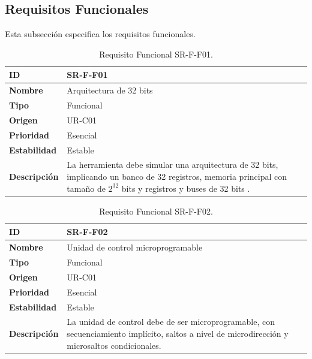 \clearpage
\subsection{Requisitos Funcionales}

Esta subsección especifica los requisitos funcionales.

\begin{center}
\begin{table}[htbp]
\centering
\begin{tabular}{@{}p{2.5cm} p{9cm}@{}} 
\toprule
\textbf{ID} 				& SR-F-F01 \\
\midrule
\textbf{Nombre} 			& Arquitectura de 32 bits \\
\midrule
\textbf{Tipo} 			& Funcional \\
\midrule
\textbf{Origen} 			& UR-C01 \\
\midrule
\textbf{Prioridad}		& Esencial \\
\midrule
\textbf{Estabilidad} 		& Estable \\
\midrule
\textbf{Descripción} 	& La herramienta debe simular una arquitectura de 32 bits, implicando un banco de 32 registros, memoria principal con tamaño de  $2^{32}$ bits y registros y buses de 32 bits . \\
\bottomrule
\end{tabular}
\caption{Requisito Funcional SR-F-F01.}
\label{tab:srff01}
\end{table}
\end{center}

\begin{center}
\begin{table}[htbp]
\centering
\begin{tabular}{@{}p{2.5cm} p{9cm}@{}} 
\toprule
\textbf{ID} 				& SR-F-F02 \\
\midrule
\textbf{Nombre} 			& Unidad de control microprogramable \\
\midrule
\textbf{Tipo} 			& Funcional \\
\midrule
\textbf{Origen} 			& UR-C01 \\
\midrule
\textbf{Prioridad}		& Esencial \\
\midrule
\textbf{Estabilidad} 		& Estable \\
\midrule
\textbf{Descripción} 	& La unidad de control debe de ser microprogramable, con secuenciamiento implícito, saltos a nivel de microdirección y microsaltos condicionales. \\
\bottomrule
\end{tabular}
\caption{Requisito Funcional SR-F-F02.}
\label{tab:srff02}
\end{table}
\end{center}

